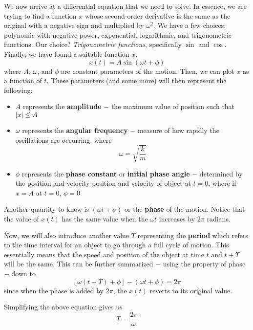 We now arrive at a differential equation that we need to solve. In essence, we are trying to 
find a function $x$ whose second-order derivative is the same as the original with a negative sign
and multiplied by $\omega^2$.
We have a few choices: polynomic with negative power, exponential, logarithmic, and trigonometric
functions. Our choice? \textit{Trigonometric functions}, specifically $\sin$ and $\cos$. Finally,
we have found a suitable function $x$.
\begin{equation}\label{15.6}
    x(t) = A\sin(\omega t + \phi)
\end{equation} 
where $A$, $\omega$, and $\phi$ are constant parameters of the motion. Then, we can plot $x$ as
a function of $t$. These parameters (and some more) will then represent the following:
\begin{itemize}
    \item $A$ represents the \textbf{amplitude} $-$ the maximum value of position such that $|x|\leq A$
    \item $\omega$ represents the \textbf{angular frequency} $-$ measure of how rapidly the oscillations
        are occurring, where \begin{equation}\label{15.9}
            \omega = \sqrt{\frac{k}{m}}
        \end{equation}
    \item $\phi$ represents the \textbf{phase constant} or \textbf{initial phase angle} $-$
        determined by the position and velocity position and velocity of object at $t=0$, where
        if $x=A$ at $t=0$, $\phi = 0$
\end{itemize}

Another quantity to know is $(\omega t + \phi)$ or the \textbf{phase} of the motion.
Notice that the value of $x(t)$ has the same value when the $\omega t$ increases by $2\pi$ radians.

Now, we will also introduce another value $T$ representing the \textbf{period} which refers to 
the time interval for an object to go through a full cycle of motion. This essentially means that 
the speed and position of the object at time $t$ and $t+T$ will be the same. This can be further
summarized $-$ using the property of phase $-$ down to 
\[ \left[\omega(t + T) + \phi\right] - (\omega t +\phi) = 2\pi \]
since when the phase is added by $2\pi$, the $x(t)$ reverts to its original value.

Simplifying the above equation gives us
\begin{equation}\label{15.10}
    T = \frac{2\pi}{\omega}
\end{equation}

